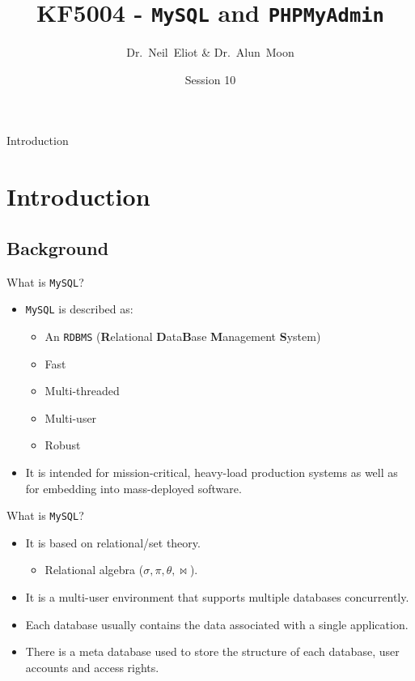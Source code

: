 \documentclass[xcolor=table]{beamer}
\title{KF5004 - \texttt{MySQL} and \texttt{PHPMyAdmin}}
\author{Dr.~Neil~Eliot \& Dr.~Alun~Moon}
\institute[Northumbria University] %
{
  Department of Computer and Information Sciences\\
  University of Northumbria
}
\date{Session 10}
\begin{document}
\begin{frame}
  \titlepage
\end{frame}

\begin{frame}{Introduction}
  \tableofcontents
\end{frame}


\section{Introduction}
\subsection{Background}
\begin{frame}{What is \texttt{MySQL}?}
  \begin{itemize}
    \item \texttt{MySQL} is described as:
      \begin{itemize}
        \item An \texttt{RDBMS} (\textbf{R}elational \textbf{D}ata\textbf{B}ase \textbf{M}anagement \textbf{S}ystem)
        \item Fast
        \item Multi-threaded
        \item Multi-user
        \item Robust 
      \end{itemize}
    \item It is intended for mission-critical, heavy-load production systems as well as for embedding into mass-deployed software.
  \end{itemize}
\end{frame}

\begin{frame}{What is \texttt{MySQL}?}
  \begin{itemize}
    \item It is based on relational/set theory.
      \begin{itemize}
        \item Relational algebra ($\sigma,\pi,\theta,\bowtie$). 
      \end{itemize}
    \item It is a multi-user environment that supports multiple databases concurrently.
    \item Each database usually contains the data associated with a single application.
    \item There is a meta database used to store the structure of each database, user accounts and access rights.
  \end{itemize}
\end{frame}
\end{document}
